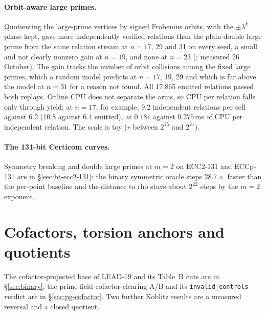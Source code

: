 \paragraph{Orbit-aware large primes.} Quotienting the large-prime vertices
by signed Frobenius orbits, with the $\pm\lambda^k$ phase kept, gave more
independently verified relations than the plain double large prime from the
same relation stream at $n=17$, 29 and 31 on every seed, a small and not
clearly nonzero gain at $n=19$, and none at $n=23$
(; measured
26 October). The gain tracks the number of orbit collisions among the fixed
large primes, which a random model predicts at $n=17$, 19, 29 and which is
far above the model at $n=31$ for a reason not found. All 17{,}865 emitted
relations passed both replays. Online CPU does not separate the arms, so
CPU per relation falls only through yield; at $n=17$, for example, 9.2
independent relations per cell against 6.2 (10.8 against 6.4 emitted), at
$0.181$ against $0.275$\,ms of CPU per independent relation. The scale is toy ($r$ between $2^{15}$ and $2^{21}$).

\paragraph{The 131-bit Certicom curves.} Symmetry breaking and double large
primes at $m=2$ on ECC2-131 and ECCp-131 are in \S\ref{sec:bt-ecc2-131}:
the binary symmetric oracle steps $28.7\times$ faster than the per-point
baseline and the distance to rho stays about $2^{22}$ steps by the $m=2$
exponent.

\section{Cofactors, torsion anchors and quotients}\label{sec:kc-torsion}

The cofactor-projected base of LEAD-19 and its Table~B cuts are in
\S\ref{sec:binary}; the prime-field cofactor-clearing A/B and its
\texttt{invalid\_controls} verdict are in \S\ref{sec:pg-cofactor}. Two
further Koblitz results are a measured reversal and a closed quotient.

